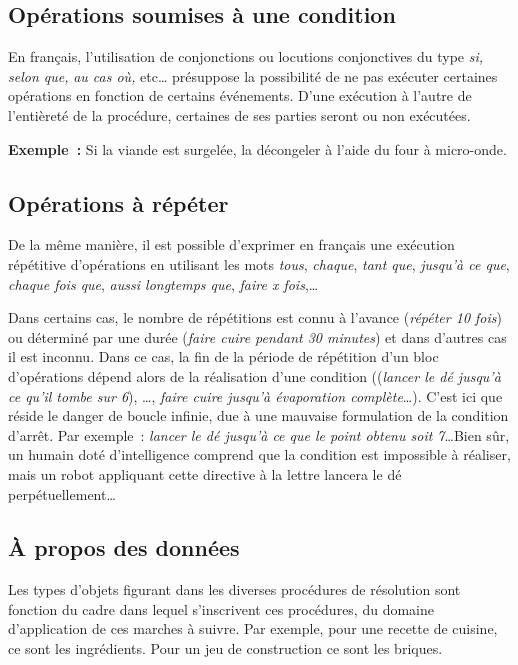 	\subsection{Opérations soumises à une condition}

		En français, l’utilisation de conjonctions ou locutions conjonctives du
		type \textit{si}\textit{, selon que, }\textit{au cas où, }etc\dots
		présuppose la possibilité de ne pas exécuter certaines opérations en
		fonction de certains événements. D’une exécution à l’autre de
		l’entièreté de la procédure, certaines de ses parties seront ou non
		exécutées.
		
		\textbf{Exemple~:} Si la viande est surgelée, la décongeler à
		l'aide du four à micro-onde.

	\subsection{Opérations à répéter}

		De la même manière, il est possible d’exprimer en français une exécution
		répétitive d’opérations en utilisant les mots \textit{tous},
		\textit{chaque}, \textit{tant que}, \textit{jusqu’à ce que},
		\textit{chaque fois que}, \textit{aussi longtemps que}, 
		\textit{faire x fois},\dots 
		
		Dans certains cas, le nombre de répétitions est connu à l’avance
		(\textit{répéter 10 fois}) ou déterminé par une durée (\textit{faire
		cuire pendant 30 minutes}) et dans d’autres cas il est inconnu.
		Dans ce cas, la fin de la période
		de répétition d’un bloc d’opérations dépend alors de la réalisation
		d’une condition ((\textit{lancer le dé jusqu'à ce
		qu'il tombe sur 6}), \dots, \textit{faire cuire
		jusqu’à évaporation complète}\dots). C’est ici que réside le danger de
		boucle infinie, due à une mauvaise formulation de la condition d’arrêt.
		Par exemple~: \textit{lancer le dé jusqu’à ce que le point 
		obtenu soit 7}\dots Bien sûr, un humain doté d'intelligence 
		comprend que la condition est impossible à réaliser, mais un robot 
		appliquant cette directive à la lettre lancera le dé 
		perpétuellement\dots

	\subsection{À propos des données}

		Les types d’objets figurant dans les diverses procédures de résolution
		sont fonction du cadre dans lequel s’inscrivent ces procédures, du
		domaine d’application de ces marches à suivre. Par exemple, pour une
		recette de cuisine, ce sont les ingrédients. Pour un jeu de
		construction ce sont les briques.
		
